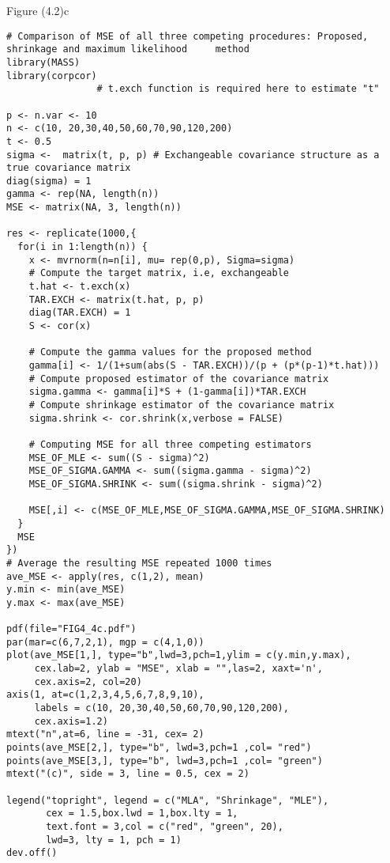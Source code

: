 Figure (4.2)c
\begin{lstlisting}
# Comparison of MSE of all three competing procedures: Proposed, shrinkage and maximum likelihood     method
library(MASS)
library(corpcor)
                # t.exch function is required here to estimate "t"

p <- n.var <- 10
n <- c(10, 20,30,40,50,60,70,90,120,200)
t <- 0.5
sigma <-  matrix(t, p, p) # Exchangeable covariance structure as a true covariance matrix
diag(sigma) = 1
gamma <- rep(NA, length(n))
MSE <- matrix(NA, 3, length(n))

res <- replicate(1000,{
  for(i in 1:length(n)) {
    x <- mvrnorm(n=n[i], mu= rep(0,p), Sigma=sigma)
    # Compute the target matrix, i.e, exchangeable
    t.hat <- t.exch(x)
    TAR.EXCH <- matrix(t.hat, p, p)
    diag(TAR.EXCH) = 1
    S <- cor(x)
    
    # Compute the gamma values for the proposed method
    gamma[i] <- 1/(1+sum(abs(S - TAR.EXCH))/(p + (p*(p-1)*t.hat)))
    # Compute proposed estimator of the covariance matrix 
    sigma.gamma <- gamma[i]*S + (1-gamma[i])*TAR.EXCH
    # Compute shrinkage estimator of the covariance matrix
    sigma.shrink <- cor.shrink(x,verbose = FALSE)
    
    # Computing MSE for all three competing estimators    
    MSE_OF_MLE <- sum((S - sigma)^2)
    MSE_OF_SIGMA.GAMMA <- sum((sigma.gamma - sigma)^2)
    MSE_OF_SIGMA.SHRINK <- sum((sigma.shrink - sigma)^2)
    
    MSE[,i] <- c(MSE_OF_MLE,MSE_OF_SIGMA.GAMMA,MSE_OF_SIGMA.SHRINK)
  }
  MSE
})
# Average the resulting MSE repeated 1000 times 
ave_MSE <- apply(res, c(1,2), mean)
y.min <- min(ave_MSE)
y.max <- max(ave_MSE)

pdf(file="FIG4_4c.pdf")
par(mar=c(6,7,2,1), mgp = c(4,1,0))
plot(ave_MSE[1,], type="b",lwd=3,pch=1,ylim = c(y.min,y.max),
     cex.lab=2, ylab = "MSE", xlab = "",las=2, xaxt='n',
     cex.axis=2, col=20)
axis(1, at=c(1,2,3,4,5,6,7,8,9,10),
     labels = c(10, 20,30,40,50,60,70,90,120,200),
     cex.axis=1.2)
mtext("n",at=6, line = -31, cex= 2)
points(ave_MSE[2,], type="b", lwd=3,pch=1 ,col= "red")
points(ave_MSE[3,], type="b", lwd=3,pch=1 ,col= "green")
mtext("(c)", side = 3, line = 0.5, cex = 2)

legend("topright", legend = c("MLA", "Shrinkage", "MLE"),
       cex = 1.5,box.lwd = 1,box.lty = 1,
       text.font = 3,col = c("red", "green", 20),
       lwd=3, lty = 1, pch = 1)
dev.off()
\end{lstlisting}

